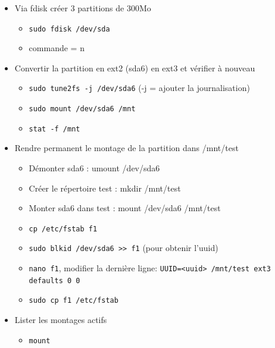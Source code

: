 \documentclass[a4paper]{article}
\begin{document}
\begin{itemize}

\item Via fdisk créer 3 partitions de 300Mo
\begin{example}
    \begin{itemize}
        \item \texttt{sudo fdisk /dev/sda}
        \item commande = n
    \end{itemize}
\end{example}

\item Convertir la partition en ext2 (sda6) en ext3 et vérifier à nouveau
\begin{example}
    \begin{itemize}
        \item \texttt{sudo tune2fs -j /dev/sda6} (-j = ajouter la journalisation)
        \item \texttt{sudo mount /dev/sda6 /mnt}
        \item \texttt{stat -f /mnt}
    \end{itemize}
\end{example}

\item Rendre permanent le montage de la partition dans /mnt/test
\begin{itemize}
    \item Démonter sda6 : umount /dev/sda6
    \item Créer le répertoire test : mkdir /mnt/test
    \item Monter sda6 dans test : mount /dev/sda6 /mnt/test
\end{itemize}
\begin{example}
    \begin{itemize}
        \item \texttt{cp /etc/fstab f1}
        \item \texttt{sudo blkid /dev/sda6 >{}> f1} (pour obtenir l'uuid)
        \item \texttt{nano f1}, modifier la dernière ligne: \texttt{UUID=<uuid> /mnt/test ext3 defaults 0 0}
        \item \texttt{sudo cp f1 /etc/fstab}
    \end{itemize}
\end{example}

\item Lister les montages actifs
\begin{example}
    \begin{itemize}
        \item \texttt{mount}
    \end{itemize}
\end{example}


\end{itemize}
\end{document}
